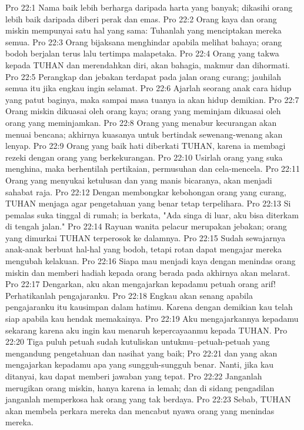 Pro 22:1  Nama baik lebih berharga daripada harta yang banyak; dikasihi orang lebih baik daripada diberi perak dan emas.
Pro 22:2  Orang kaya dan orang miskin mempunyai satu hal yang sama: Tuhanlah yang menciptakan mereka semua.
Pro 22:3  Orang bijaksana menghindar apabila melihat bahaya; orang bodoh berjalan terus lalu tertimpa malapetaka.
Pro 22:4  Orang yang takwa kepada TUHAN dan merendahkan diri, akan bahagia, makmur dan dihormati.
Pro 22:5  Perangkap dan jebakan terdapat pada jalan orang curang; jauhilah semua itu jika engkau ingin selamat.
Pro 22:6  Ajarlah seorang anak cara hidup yang patut baginya, maka sampai masa tuanya ia akan hidup demikian.
Pro 22:7  Orang miskin dikuasai oleh orang kaya; orang yang meminjam dikuasai oleh orang yang meminjamkan.
Pro 22:8  Orang yang menabur kecurangan akan menuai bencana; akhirnya kuasanya untuk bertindak sewenang-wenang akan lenyap.
Pro 22:9  Orang yang baik hati diberkati TUHAN, karena ia membagi rezeki dengan orang yang berkekurangan.
Pro 22:10  Usirlah orang yang suka menghina, maka berhentilah pertikaian, permusuhan dan cela-mencela.
Pro 22:11  Orang yang menyukai ketulusan dan yang manis bicaranya, akan menjadi sahabat raja.
Pro 22:12  Dengan membongkar kebohongan orang yang curang, TUHAN menjaga agar pengetahuan yang benar tetap terpelihara.
Pro 22:13  Si pemalas suka tinggal di rumah; ia berkata, "Ada singa di luar, aku bisa diterkam di tengah jalan."
Pro 22:14  Rayuan wanita pelacur merupakan jebakan; orang yang dimurkai TUHAN terperosok ke dalamnya.
Pro 22:15  Sudah sewajarnya anak-anak berbuat hal-hal yang bodoh, tetapi rotan dapat mengajar mereka mengubah kelakuan.
Pro 22:16  Siapa mau menjadi kaya dengan menindas orang miskin dan memberi hadiah kepada orang berada pada akhirnya akan melarat.
Pro 22:17  Dengarkan, aku akan mengajarkan kepadamu petuah orang arif! Perhatikanlah pengajaranku.
Pro 22:18  Engkau akan senang apabila pengajaranku itu kausimpan dalam hatimu. Karena dengan demikian kau telah siap apabila kau hendak memakainya.
Pro 22:19  Aku mengajarkannya kepadamu sekarang karena aku ingin kau menaruh kepercayaanmu kepada TUHAN.
Pro 22:20  Tiga puluh petuah sudah kutuliskan untukmu--petuah-petuah yang mengandung pengetahuan dan nasihat yang baik;
Pro 22:21  dan yang akan mengajarkan kepadamu apa yang sungguh-sungguh benar. Nanti, jika kau ditanyai, kau dapat memberi jawaban yang tepat.
Pro 22:22  Janganlah merugikan orang miskin, hanya karena ia lemah; dan di sidang pengadilan janganlah memperkosa hak orang yang tak berdaya.
Pro 22:23  Sebab, TUHAN akan membela perkara mereka dan mencabut nyawa orang yang menindas mereka.
